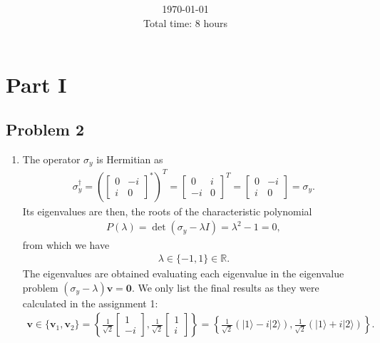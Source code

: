 \documentclass[letterpaper,11pt,twoside]{article}
\title{\textbf{\assignment}\\\course\\{\Large\institution}}
\author{\autor}
\date{\today\\Total time: 8 hours}
\newcommand{\ket}[1]{|#1\rangle}
\begin{document}
\pagestyle{mainstyle}
\maketitle
\section*{Part I}
\subsection*{Problem 2}
\begin{enumerate}[itemsep=0pt,topsep=0pt,label=\alph*.]
  \item The operator $\sigma_y$ is Hermitian as 
  \begin{align*}
    \sigma_y^\dagger=\left(\begin{bmatrix}
      0&-i\\i&0
    \end{bmatrix}^*\right)^T=\begin{bmatrix}
    0&i\\-i&0
  \end{bmatrix}^T=\begin{bmatrix}
    0&-i\\i&0
  \end{bmatrix}=\sigma_y.
  \end{align*}
  Its eigenvalues are then, the roots of the characteristic polynomial
  \begin{align*}
    P(\lambda)=\det(\sigma_y-\lambda I)=\lambda^2-1=0,
  \end{align*}
  from which we have 
  \begin{align}
    \lambda\in\{-1,1\}\in\mathbb{R}.
  \end{align}
  The eigenvalues are obtained evaluating each eigenvalue in the eigenvalue problem $(\sigma_y-\lambda)\bm{v}=\bm{0}$.
  We only list the final results as they were calculated in the assignment 1:
  \begin{align}
    \bm{v}\in\{\bm{v}_1,\bm{v}_2\}=\left\{\frac{1}{\sqrt{2}}\begin{bmatrix}
    1\\-i
    \end{bmatrix},\frac{1}{\sqrt{2}}\begin{bmatrix}
    1\\i
    \end{bmatrix}\right\}=\left\{\frac{1}{\sqrt{2}}(\ket{1}-i\ket{2}),\frac{1}{\sqrt{2}}(\ket{1}+i\ket{2})\right\}.
  \end{align}

\end{enumerate}
\end{document}
